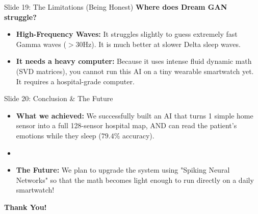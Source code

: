 \documentclass[aspectratio=169]{beamer}
\newcommand{\easysize}{\large}
\begin{document}

\begin{frame}{Slide 19: The Limitations (Being Honest)}
    \easysize
    \textbf{Where does Dream GAN struggle?}
    \begin{itemize}
        \item \textbf{High-Frequency Waves:} It struggles slightly to guess extremely fast Gamma waves ($>30$Hz). It is much better at slower Delta sleep waves.
        \item \textbf{It needs a heavy computer:} Because it uses intense fluid dynamic math (SVD matrices), you cannot run this AI on a tiny wearable smartwatch yet. It requires a hospital-grade computer.
    \end{itemize}
\end{frame}

\begin{frame}{Slide 20: Conclusion \& The Future}
    \easysize
    \begin{itemize}
        \item \textbf{What we achieved:} We successfully built an AI that turns 1 simple home sensor into a full 128-sensor hospital map, AND can read the patient's emotions while they sleep ($79.4\%$ accuracy).
        \item \vspace{0.3cm}
        \item \textbf{The Future:} We plan to upgrade the system using "Spiking Neural Networks" so that the math becomes light enough to run directly on a daily smartwatch!
    \end{itemize}
    \vspace{0.5cm}
    \begin{center}
        \textbf{\huge Thank You!}
    \end{center}
\end{frame}
\end{document}
